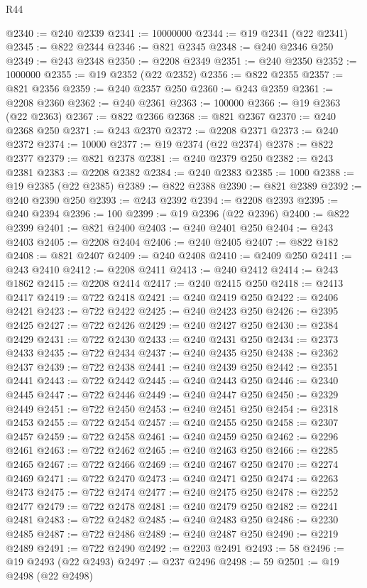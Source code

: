 \begin{lexlean}{R44}
\begin{coremodule}
{@2340 := @240 @2339
@2341 := 10000000
@2344 := @19 @2341 (@22 @2341)
@2345 := @822 @2344
@2346 := @821 @2345
@2348 := @240 @2346 @250
@2349 := @243 @2348
@2350 := @2208 @2349
@2351 := @240 @2350
@2352 := 1000000
@2355 := @19 @2352 (@22 @2352)
@2356 := @822 @2355
@2357 := @821 @2356
@2359 := @240 @2357 @250
@2360 := @243 @2359
@2361 := @2208 @2360
@2362 := @240 @2361
@2363 := 100000
@2366 := @19 @2363 (@22 @2363)
@2367 := @822 @2366
@2368 := @821 @2367
@2370 := @240 @2368 @250
@2371 := @243 @2370
@2372 := @2208 @2371
@2373 := @240 @2372
@2374 := 10000
@2377 := @19 @2374 (@22 @2374)
@2378 := @822 @2377
@2379 := @821 @2378
@2381 := @240 @2379 @250
@2382 := @243 @2381
@2383 := @2208 @2382
@2384 := @240 @2383
@2385 := 1000
@2388 := @19 @2385 (@22 @2385)
@2389 := @822 @2388
@2390 := @821 @2389
@2392 := @240 @2390 @250
@2393 := @243 @2392
@2394 := @2208 @2393
@2395 := @240 @2394
@2396 := 100
@2399 := @19 @2396 (@22 @2396)
@2400 := @822 @2399
@2401 := @821 @2400
@2403 := @240 @2401 @250
@2404 := @243 @2403
@2405 := @2208 @2404
@2406 := @240 @2405
@2407 := @822 @182
@2408 := @821 @2407
@2409 := @240 @2408
@2410 := @2409 @250
@2411 := @243 @2410
@2412 := @2208 @2411
@2413 := @240 @2412
@2414 := @243 @1862
@2415 := @2208 @2414
@2417 := @240 @2415 @250
@2418 := @2413 @2417
@2419 := @722 @2418
@2421 := @240 @2419 @250
@2422 := @2406 @2421
@2423 := @722 @2422
@2425 := @240 @2423 @250
@2426 := @2395 @2425
@2427 := @722 @2426
@2429 := @240 @2427 @250
@2430 := @2384 @2429
@2431 := @722 @2430
@2433 := @240 @2431 @250
@2434 := @2373 @2433
@2435 := @722 @2434
@2437 := @240 @2435 @250
@2438 := @2362 @2437
@2439 := @722 @2438
@2441 := @240 @2439 @250
@2442 := @2351 @2441
@2443 := @722 @2442
@2445 := @240 @2443 @250
@2446 := @2340 @2445
@2447 := @722 @2446
@2449 := @240 @2447 @250
@2450 := @2329 @2449
@2451 := @722 @2450
@2453 := @240 @2451 @250
@2454 := @2318 @2453
@2455 := @722 @2454
@2457 := @240 @2455 @250
@2458 := @2307 @2457
@2459 := @722 @2458
@2461 := @240 @2459 @250
@2462 := @2296 @2461
@2463 := @722 @2462
@2465 := @240 @2463 @250
@2466 := @2285 @2465
@2467 := @722 @2466
@2469 := @240 @2467 @250
@2470 := @2274 @2469
@2471 := @722 @2470
@2473 := @240 @2471 @250
@2474 := @2263 @2473
@2475 := @722 @2474
@2477 := @240 @2475 @250
@2478 := @2252 @2477
@2479 := @722 @2478
@2481 := @240 @2479 @250
@2482 := @2241 @2481
@2483 := @722 @2482
@2485 := @240 @2483 @250
@2486 := @2230 @2485
@2487 := @722 @2486
@2489 := @240 @2487 @250
@2490 := @2219 @2489
@2491 := @722 @2490
@2492 := @2203 @2491
@2493 := 58
@2496 := @19 @2493 (@22 @2493)
@2497 := @237 @2496
@2498 := 59
@2501 := @19 @2498 (@22 @2498)
}
\end{coremodule}
\end{lexlean}
